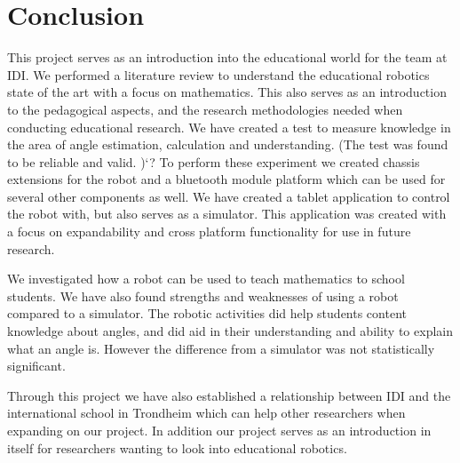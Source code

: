 \section{Conclusion}
This project serves as an introduction into the educational world for the \chirp team at IDI.
We performed a literature review to understand the educational robotics state of the art with a focus on mathematics. 
This also serves as an introduction to the pedagogical aspects, and the research methodologies needed when conducting educational research.
We have created a test to measure knowledge in the area of angle estimation, calculation and understanding. (The test was found to be reliable and valid. )`?
To perform these experiment we created chassis extensions for the robot and a bluetooth module platform which can be used for several other components as well.
We have created a tablet application to control the robot with, but also serves as a simulator. This application was created with a focus on expandability and cross platform functionality for use in future research.

\bigskip\noindent
We investigated how a robot can be used to teach mathematics to school students. We have also found strengths and weaknesses of using a robot compared to a simulator. 
The robotic activities did help students content knowledge about angles, and did aid in their understanding and ability to explain what an angle is. However the difference from a simulator was not statistically significant.

\bigskip\noindent
Through this project we have also established a relationship between IDI and the international school in Trondheim which can help other researchers when expanding on our project. In addition our project serves as an introduction in itself for researchers wanting to look into educational robotics. 

